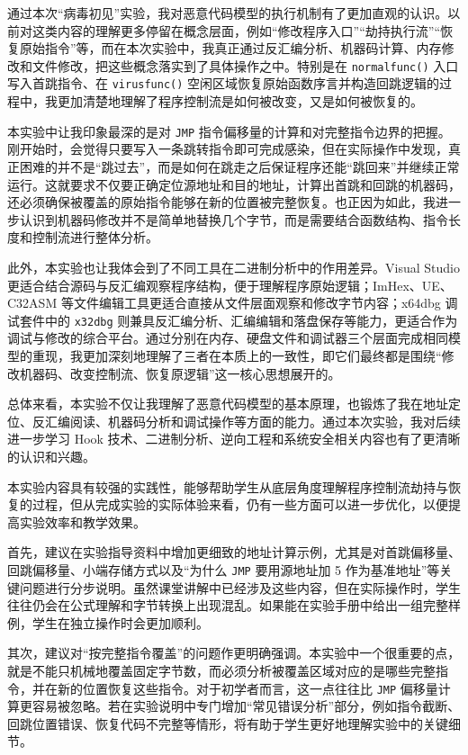 ﻿\documentclass[12pt]{ctexart}
\begin{document}
通过本次“病毒初见”实验，我对恶意代码模型的执行机制有了更加直观的认识。以前对这类内容的理解更多停留在概念层面，例如“修改程序入口”“劫持执行流”“恢复原始指令”等，而在本次实验中，我真正通过反汇编分析、机器码计算、内存修改和文件修改，把这些概念落实到了具体操作之中。特别是在 \texttt{normalfunc()} 入口写入首跳指令、在 \texttt{virusfunc()} 空闲区域恢复原始函数序言并构造回跳逻辑的过程中，我更加清楚地理解了程序控制流是如何被改变，又是如何被恢复的。

本实验中让我印象最深的是对 \texttt{JMP} 指令偏移量的计算和对完整指令边界的把握。刚开始时，会觉得只要写入一条跳转指令即可完成感染，但在实际操作中发现，真正困难的并不是“跳过去”，而是如何在跳走之后保证程序还能“跳回来”并继续正常运行。这就要求不仅要正确定位源地址和目的地址，计算出首跳和回跳的机器码，还必须确保被覆盖的原始指令能够在新的位置被完整恢复。也正因为如此，我进一步认识到机器码修改并不是简单地替换几个字节，而是需要结合函数结构、指令长度和控制流进行整体分析。

此外，本实验也让我体会到了不同工具在二进制分析中的作用差异。Visual Studio 更适合结合源码与反汇编观察程序结构，便于理解程序原始逻辑；ImHex、UE、C32ASM 等文件编辑工具更适合直接从文件层面观察和修改字节内容；x64dbg 调试套件中的 \texttt{x32dbg} 则兼具反汇编分析、汇编编辑和落盘保存等能力，更适合作为调试与修改的综合平台。通过分别在内存、硬盘文件和调试器三个层面完成相同模型的重现，我更加深刻地理解了三者在本质上的一致性，即它们最终都是围绕“修改机器码、改变控制流、恢复原逻辑”这一核心思想展开的。

总体来看，本实验不仅让我理解了恶意代码模型的基本原理，也锻炼了我在地址定位、反汇编阅读、机器码分析和调试操作等方面的能力。通过本次实验，我对后续进一步学习 Hook 技术、二进制分析、逆向工程和系统安全相关内容也有了更清晰的认识和兴趣。

\vspace{1.2cm}


本实验内容具有较强的实践性，能够帮助学生从底层角度理解程序控制流劫持与恢复的过程，但从完成实验的实际体验来看，仍有一些方面可以进一步优化，以便提高实验效率和教学效果。

首先，建议在实验指导资料中增加更细致的地址计算示例，尤其是对首跳偏移量、回跳偏移量、小端存储方式以及“为什么 \texttt{JMP} 要用源地址加 5 作为基准地址”等关键问题进行分步说明。虽然课堂讲解中已经涉及这些内容，但在实际操作时，学生往往仍会在公式理解和字节转换上出现混乱。如果能在实验手册中给出一组完整样例，学生在独立操作时会更加顺利。

其次，建议对“按完整指令覆盖”的问题作更明确强调。本实验中一个很重要的点，就是不能只机械地覆盖固定字节数，而必须分析被覆盖区域对应的是哪些完整指令，并在新的位置恢复这些指令。对于初学者而言，这一点往往比 \texttt{JMP} 偏移量计算更容易被忽略。若在实验说明中专门增加“常见错误分析”部分，例如指令截断、回跳位置错误、恢复代码不完整等情形，将有助于学生更好地理解实验中的关键细节。
\end{document}
